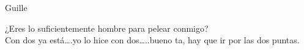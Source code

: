 \begin{IEEEbiography}{Guille}



¿Eres lo suficientemente hombre para pelear conmigo?\\
Con dos ya está….yo lo hice con dos…..bueno ta,  hay que ir por las dos puntas.
\end{IEEEbiography}
